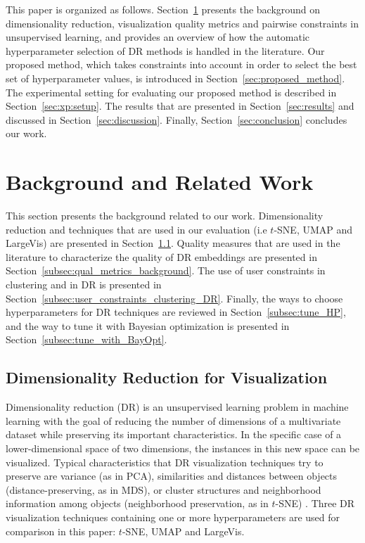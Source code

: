 This paper is organized as follows. Section~\ref{sec:background} presents the background on dimensionality reduction, visualization quality metrics and pairwise constraints in unsupervised learning, and provides an overview of how the automatic hyperparameter selection of DR methods is handled in the literature. Our proposed method, which takes constraints into account in order to select the best set of hyperparameter values, is introduced in Section~\ref{sec:proposed_method}. The experimental setting for evaluating our proposed method is described in Section~\ref{sec:xp:setup}. The results that are presented in Section~\ref{sec:results} and discussed in Section~\ref{sec:discussion}. Finally, Section~\ref{sec:conclusion} concludes our work.

\section{Background and Related Work}\label{sec:background}

This section presents the background related to our work. Dimensionality reduction and techniques that are used in our evaluation (i.e $t$-SNE, UMAP and LargeVis) are presented in Section~\ref{subsec:background_DR}. Quality measures that are used in the literature to characterize the quality of DR embeddings are presented in Section~\ref{subsec:qual_metrics_background}. The use of user constraints in clustering and in DR is presented in Section~\ref{subsec:user_constraints_clustering_DR}. Finally, the ways to choose hyperparameters for DR techniques are reviewed in Section~\ref{subsec:tune_HP}, and the way to tune it with Bayesian optimization is presented in Section~\ref{subsec:tune_with_BayOpt}.

\subsection{Dimensionality Reduction for Visualization}\label{subsec:background_DR}

Dimensionality reduction (DR) is an unsupervised learning problem in machine learning with the goal of reducing the number of dimensions of a multivariate dataset while preserving its important characteristics. In the specific case of a lower-dimensional space of two dimensions, the instances in this new space can be visualized. Typical characteristics that DR visualization techniques try to preserve are variance (as in PCA), similarities and distances between objects (distance-preserving, as in MDS), or cluster structures and neighborhood information among objects (neighborhood preservation, as in $t$-SNE) \cite{lee2007}. Three DR visualization techniques containing one or more hyperparameters are used for comparison in this paper: $t$-SNE, UMAP and LargeVis.

